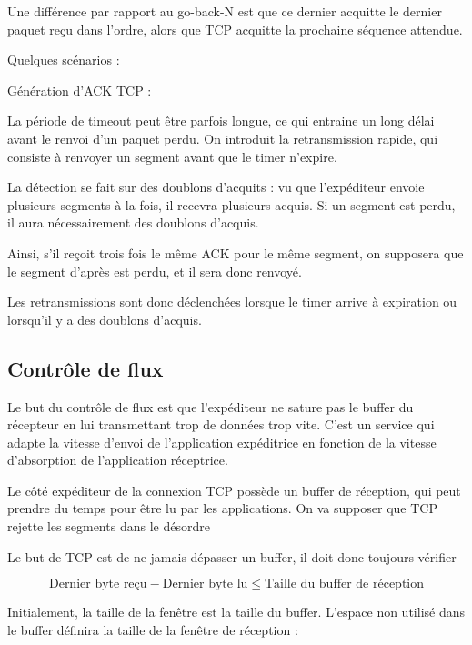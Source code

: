 Une différence par rapport au go-back-N est que ce dernier acquitte le dernier paquet reçu dans l'ordre, alors que TCP acquitte la prochaine séquence attendue.


Quelques scénarios :
		
Génération d'ACK TCP : 		 		



La période de timeout peut être parfois longue, ce qui entraine un long délai avant le renvoi d'un paquet perdu. On introduit la retransmission rapide, qui consiste à renvoyer un segment avant que le timer n'expire.
	
	La détection se fait sur des doublons d'acquits : vu que l'expéditeur envoie plusieurs segments à la fois, il recevra plusieurs acquis. Si un segment est perdu, il aura nécessairement des doublons d'acquis.
	
	Ainsi, s'il reçoit trois fois le même ACK pour le même segment, on supposera que le segment d'après est perdu, et il sera donc renvoyé.
	
	
	Les retransmissions sont donc déclenchées lorsque le timer arrive à expiration ou lorsqu'il y a des doublons d'acquis.


	\subsection{Contrôle de flux}
	
	Le but du contrôle de flux est que l'expéditeur ne sature pas le buffer du récepteur en lui transmettant trop de données trop vite. C'est un service qui adapte la vitesse d'envoi de l'application expéditrice en fonction de la vitesse d'absorption de l'application réceptrice. 		 		


Le côté expéditeur de la connexion TCP possède un buffer de réception, qui peut prendre du temps pour être lu par les applications. On va supposer que TCP rejette les segments dans le désordre
	
	
	Le but de TCP est de ne jamais dépasser un buffer, il doit donc toujours vérifier
	
	$$\text{Dernier byte reçu} - \text{Dernier byte lu} \leq \text{Taille du buffer de réception}$$
	
	Initialement, la taille de la fenêtre est la taille du buffer. L'espace non utilisé dans le buffer définira la taille de la fenêtre de réception :
	
